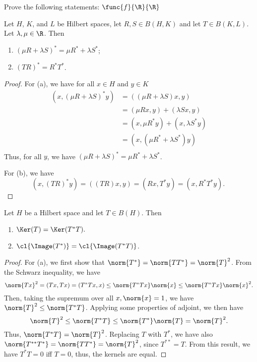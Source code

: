 \documentclass[12pt,letterpaper,twoside]{hmcpset}
\begin{document}
\noindent Prove the following statements:
$\func{f}{\R}{\R}$
\begin{problem}[1]
  Let $H$, $K$, and $L$ be Hilbert spaces, let $R,S \in B(H,K)$ and let $T \in B(K,L)$. Let $\lambda, \mu \in \R$.
  Then
  \begin{enumerate}[label=(\alph*)]
  \item $(\mu R + \lambda S)^* = \mu R^* + \lambda S^*$;
  \item $(TR)^* = R^*T^*$.
  
  \end{enumerate}
\end{problem}

\begin{solution}
  \begin{proof}
    For (a), we have for all $x \in H$ and $y \in K$
    \begin{align*}
      (x,(\mu R + \lambda S)^* y) &= ((\mu R + \lambda S) x, y) \\
      {} &= (\mu Rx, y) + (\lambda Sx, y) \\
      {} &= (x, \mu R^* y) + (x, \lambda S^* y) \\
      {} &= (x, (\mu R^* + \lambda S^*) y )\\
    \end{align*}
    Thus, for all $y$, we have $(\mu R + \lambda S)^* = \mu R^* + \lambda S^*$.
    
    For (b), we have \[
    (x,(TR)^* y) = ((TR)x, y) = (Rx, T^*y) = (x, R^*T^*y).\
    \]

  \end{proof}
\end{solution}

\begin{problem}[2]
  Let $H$ be a Hilbert space and let $T \in B(H)$. Then
  \begin{enumerate}[label=(\alph*)]
  \item $\Ker(T) = \Ker(T^*T).$
  \item $\cl{\Image(T^*)} = \cl{\Image(T^*T)}$.
  \end{enumerate}
\end{problem}

\begin{solution}
  \begin{proof}
    \label{prf:1}
    For (a), we first show that $\norm{T^*} = \norm{TT^*} = \norm{T}^2$.
    From the Schwarz inequality, we have \[
    \norm{Tx}^2 = (Tx, Tx) = (T^*Tx, x) \leq \norm{T^*Tx}\norm{x} \leq \norm{T^*Tx}\norm{x}^2. 
    \]
    Then, taking the supremum over all $x, \norm{x} = 1$, we have $\norm{T}^2 \leq \norm{T^*T}$.
    Applying some properties of adjoint, we then have \[
    \norm{T}^2 \leq \norm{T^*T} \leq \norm{T^*}\norm{T} = \norm{T}^2.
    \]
    Thus, $\norm{T^*T} = \norm{T}^2$. 
    Replacing $T$ with $T^*$, we have also $\norm{T^{**}T^*} = \norm{TT^*} = \norm{T}^2$, since $T^{**} = T$.
    From this result, we have $T^*T = 0$ iff $T = 0$, thus, the kernels are equal.
  \end{proof}
\end{solution}
\end{document}
